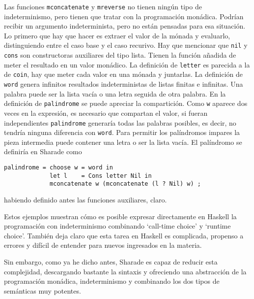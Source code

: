 \documentclass[class=article, crop=false]{standalone}
\begin{document}
Las funciones \verb`mconcatenate` y \verb`mreverse` no tienen ningún tipo de indeterminismo,
pero tienen que tratar con la programación monádica. Podrían recibir un argumento
indeterminista, pero no están pensadas para esa situación. Lo primero que hay que hacer es
extraer el valor de la mónada y evaluarlo, distinguiendo entre el caso base y el caso
recurivo. Hay que mencionar que \verb`nil` y \verb`cons` son constructoras auxiliares del
tipo lista. Tienen la función añadida de meter el resultado en un valor monádico. La
definición de \verb`letter` es parecida a la de \verb`coin`, hay que meter cada valor en una
mónada y juntarlas. La definición de \verb`word` genera infinitos resultados indeterministas
de listas finitas e infinitas. Una palabra puede ser la lista vacía o una letra seguida de
otra palabra. En la definición de \verb`palindrome` se puede apreciar la compartición. Como
\verb`w` aparece dos veces en la expresión, es necesario que compartan el valor, si fueran
independientes \verb`palindrome` generaría todas las palabras posibles, es decir, no tendría
ninguna diferencia con \verb`word`. Para permitir los palíndromos impares la pieza intermedia
puede contener una letra o ser la lista vacía. El palíndromo se definiría en Sharade como
\begin{verbatim}
palindrome = choose w = word in
             let l    = Cons letter Nil in
             mconcatenate w (mconcatenate (l ? Nil) w) ;
\end{verbatim}
habiendo definido antes las funciones auxiliares, claro.

Estos ejemplos muestran cómo es posible expresar directamente en Haskell la programación con
indeterminismo combinando `call-time choice' y `runtime choice'. También deja claro que esta
tarea en Haskell es complicada, propenso a errores y difícil de entender para nuevos
ingresados en la materia.

Sin embargo, como ya he dicho antes, Sharade es capaz de reducir esta complejidad,
descargando bastante la sintaxis y ofreciendo una abstracción de la programación monádica,
indeterminismo y combinando los dos tipos de semánticas muy potentes.
\end{document}
